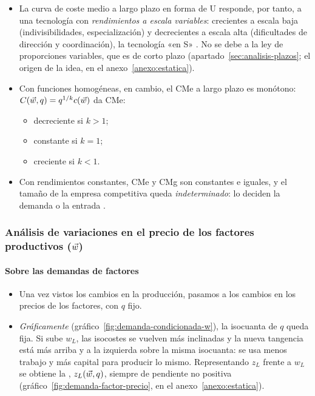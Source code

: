 \documentclass[11pt]{article}
\begin{document}
\begin{itemize}
\item La curva de coste medio a largo plazo en forma de U responde, por tanto, a una tecnología con \emph{rendimientos a escala variables}: crecientes a escala baja (indivisibilidades, especialización) y decrecientes a escala alta (dificultades de dirección y coordinación), la tecnología «en S» . No se debe a la ley de proporciones variables, que es de corto plazo (apartado~\ref{sec:analisis-plazos}; el origen de la idea, en el anexo~\ref{anexo:estatica}).
\item Con funciones homogéneas, en cambio, el CMe a largo plazo es monótono: $C(\vec{w},q)=q^{1/k}c(\vec{w})$ da CMe:
  \begin{itemize}
  \item decreciente si $k>1$;
  \item constante si $k=1$;
  \item creciente si $k<1$.
  \end{itemize}
\item Con rendimientos constantes, CMe y CMg son constantes e iguales, y el tamaño de la empresa competitiva queda \emph{indeterminado}: lo deciden la demanda o la entrada .
\end{itemize}

\subsubsection{Análisis de variaciones en el precio de los factores productivos (\texorpdfstring{$\vec{w}$}{w})}\label{sec:analisis-variaciones-precio}

\paragraph{Sobre las demandas de factores}

\begin{itemize}
\item Una vez vistos los cambios en la producción, pasamos a los cambios en los precios de los factores, con $q$ fijo.
\item \emph{Gráficamente} (gráfico~\ref{fig:demanda-condicionada-w}), la isocuanta de $q$ queda fija. Si sube $w_L$, las isocostes se vuelven más inclinadas y la nueva tangencia está más arriba y a la izquierda sobre la misma isocuanta: se usa menos trabajo y más capital para producir lo mismo. Representando $z_L$ frente a $w_L$ se obtiene la , $z_L(\vec{w},q)$, siempre de pendiente no positiva (gráfico~\ref{fig:demanda-factor-precio}, en el anexo~\ref{anexo:estatica}).
\end{itemize}
\end{document}
